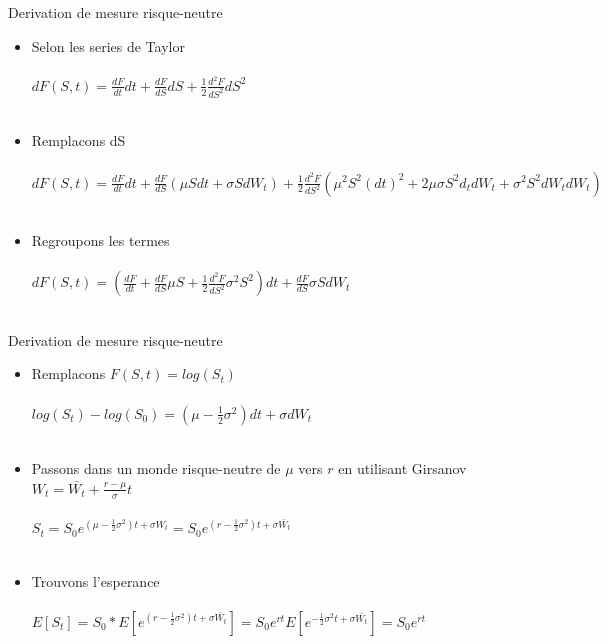 \documentclass[10pt]{beamer}
\begin{document}
\begin{frame}{Derivation de mesure risque-neutre}{}
 \begin{itemize}
    \item Selon les series de Taylor\\~\\
    $dF(S,t) = \frac{dF}{dt}dt +\frac{dF}{dS}dS + \frac{1}{2}\frac{d^{2}F}{dS^{2}}dS^{2}$\\~\\
    \item Remplacons dS \\~\\
     $dF(S,t) = \frac{dF}{dt}dt +\frac{dF}{dS}(\mu Sdt+\sigma SdW_t) + \frac{1}{2}\frac{d^{2}F}{dS^{2}}(\mu ^{2} S^{2}(dt)^{2} + 2\mu \sigma S^{2}d_tdW_t +\sigma ^{2}S^{2}dW_tdW_t)$\\~\\
     \item Regroupons les termes \\~\\
     $dF(S,t) = (\frac{dF}{dt} +\frac{dF}{dS}\mu S + \frac{1}{2}\frac{d^{2}F}{dS^{2}}\sigma ^{2} S^{2})dt + \frac{dF}{dS}\sigma SdW_t$\\~\\
     
 \end{itemize}
\end{frame}

\begin{frame}{Derivation de mesure risque-neutre}{}
 \begin{itemize}
    \item Remplacons $F(S,t)=log(S_t)$  \\~\\
    $log(S_t)-log(S_0) = (\mu - \frac{1}{2}\sigma ^{2})dt + \sigma dW_t$\\~\\
    \item Passons dans un monde risque-neutre  de $\mu$ vers $r$ en utilisant Girsanov $W_{t} = \bar{W_{t}} + \frac{r-\mu}{\sigma}t$ \\~\\
    $S_t = S_0  e ^ {(\mu - \frac{1}{2}\sigma ^{2})t + \sigma W_t} = S_0  e ^ {(r - \frac{1}{2}\sigma ^{2})t + \sigma \bar{W_t}} $\\~\\
    \item Trouvons l'esperance \\~\\
    $E[S_t] = S_0 * E[e ^ {(r - \frac{1}{2}\sigma ^{2})t + \sigma \bar{W_{t}}}] = S_0 e^{rt} E[e ^ {- \frac{1}{2}\sigma ^{2}t + \sigma \bar{W_{t}}}] = S_0 e^{rt}$\\~\\
     
 \end{itemize}
\end{frame}
\end{document}
